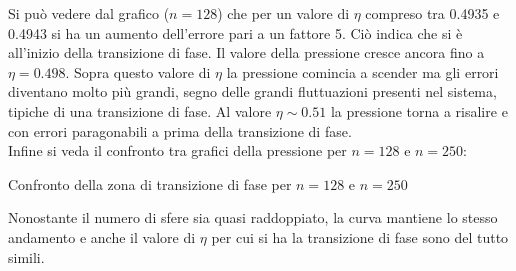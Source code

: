 Si può vedere dal grafico ($n=128$) che per un valore di $\eta$ compreso tra 0.4935 e 0.4943 si ha un aumento dell'errore pari a un fattore 5. Ciò indica che si è all'inizio della transizione di fase.
Il valore della pressione cresce ancora fino a $\eta = 0.498$.
Sopra questo valore di $\eta$ la pressione comincia a scender ma gli errori diventano molto più grandi, segno delle grandi fluttuazioni presenti nel sistema, tipiche di una transizione di fase.
Al valore $\eta \sim 0.51$ la pressione torna a risalire e con errori paragonabili a prima della transizione di fase.\\
Infine si veda il confronto tra grafici della pressione per $n=128$ e $n=250$:

\begin{myfig}[h]
	\caption{Confronto della zona di transizione di fase per $n=128$ e $n=250$}
\end{myfig}
Nonostante il numero di sfere sia quasi raddoppiato, la curva mantiene lo stesso andamento e anche il valore di $\eta$ per cui si ha la transizione di fase sono del tutto simili. 




